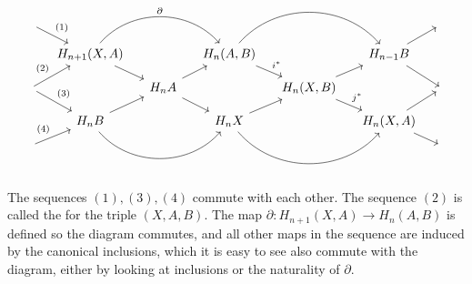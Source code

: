 \[\begin{tikzcd}[row sep=small,column sep=small]
{} \arrow[rd, "(1)"]                   &                                                                &                            &                                                       &                                         &                                  & {} \\
                                       & {H_{n+1}(X,A)} \arrow[rd] \arrow[rr, "\partial", bend left=49] &                            & {H_n(A,B)} \arrow[rr, bend left=49] \arrow[rd, "i^*"] &                                         & H_{n-1}B \arrow[rd] \arrow[ru]   &    \\
{} \arrow[ru, "(2)"] \arrow[rd, "(3)"] &                                                                & H_nA \arrow[rd] \arrow[ru] &                                                       & {H_n(X,B)} \arrow[ru] \arrow[rd, "j^*"] &                                  & {} \\
                                       & H_nB \arrow[ru] \arrow[rr, bend right=49]                      &                            & H_nX \arrow[rr, bend right=49] \arrow[ru]             &                                         & {H_n(X,A)} \arrow[ru] \arrow[rd] &    \\
{} \arrow[ru, "(4)"]                   &                                                                &                            &                                                       &                                         &                                  & {}
\end{tikzcd}\]

The sequences $(1),(3),(4)$ commute with each other. The sequence $(2)$ is called the  for the triple $(X,A,B)$. The map $\partial:H_{n+1}(X,A)\rightarrow H_{n}(A,B)$ is defined so the diagram commutes, and all other maps in the sequence are induced by the canonical inclusions, which it is easy to see also commute with the diagram, either by looking at inclusions or the naturality of $\partial$.

